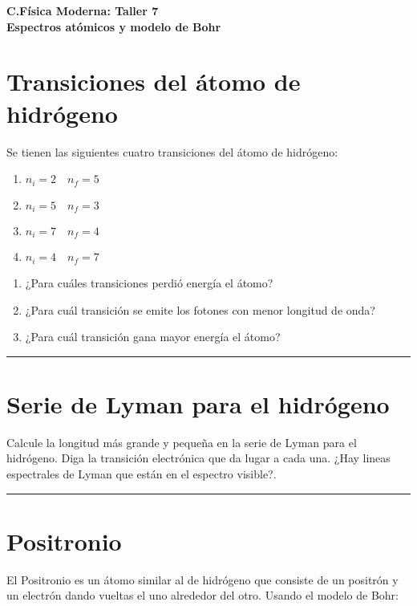 \documentclass[12pt]{article}
\begin{document}
 
\begin{center}
\Large \textbf{C.Física Moderna: Taller 7}\\
\normalsize \textbf{Espectros atómicos y modelo de Bohr}
\end{center}
 
  

\section{Transiciones del átomo de hidrógeno}

Se tienen las siguientes cuatro transiciones del átomo de hidrógeno:

\begin{enumerate}[label=\alph*)]
	\item $n_i= 2\quad n_f= 5$
	\item $n_i=5 \quad n_f= 3$
	\item $n_i=7 \quad n_f=4$
	\item $n_i=4 \quad n_f=7$
\end{enumerate}

\begin{enumerate}
	\item  ¿Para cuáles transiciones perdió energía el átomo?
	\item  ¿Para cuál transición se emite los fotones con menor longitud de onda? 
	\item ¿Para cuál transición gana mayor
	energía el átomo?
\end{enumerate}
\noindent\rule{16.5cm}{0.4pt}





\section{Serie de Lyman para el hidrógeno}

Calcule la longitud más grande y pequeña en la serie de Lyman para el hidrógeno. Diga la transición electrónica
que da lugar a cada una. ¿Hay lineas espectrales de Lyman que están en el espectro visible?.
	


\noindent\rule{16.5cm}{0.4pt}


\section{Positronio}

El Positronio es un átomo similar al de hidrógeno que consiste de un positrón y un electrón dando vueltas el uno
alrededor del otro. Usando el modelo de Bohr:
\end{document}

